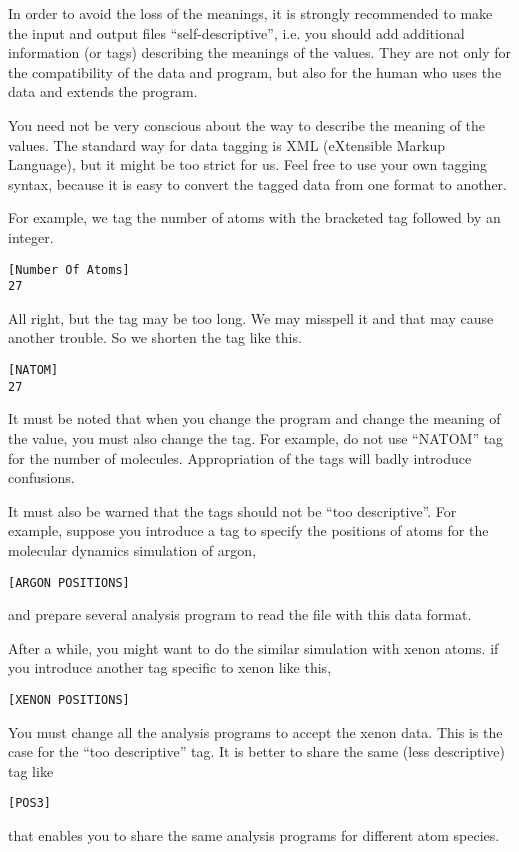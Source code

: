 \documentclass[a4,10pt]{article}
\begin{document}
In order to avoid the loss of the meanings, it is strongly recommended to make the input and output files ``self-descriptive'', i.e. you should add additional information (or tags) describing the meanings of the values.  They are not only for the compatibility of the data and program, but also for the human who uses the data and extends the program.

You need not be very conscious about the way to describe the meaning of the values.  The standard way for data tagging is XML (eXtensible Markup Language), but it might be too strict for us.  Feel free to use your own tagging syntax, because it is easy to convert the tagged data from one format to another.  

For example, we tag the number of atoms with the bracketed tag followed by an integer.
\begin{screen}\begin{verbatim}
[Number Of Atoms]
27
\end{verbatim}\end{screen}
All right, but the tag may be too long. We may misspell it and that may cause another trouble.  So we shorten the tag like this.
\begin{screen}\begin{verbatim}
[NATOM]
27
\end{verbatim}\end{screen}

It must be noted that when you change the program and change the meaning of the value, you must also change the tag.  For example, do not use ``NATOM'' tag for the number of molecules.  Appropriation of the tags will badly introduce confusions.

It must also be warned that the tags should not be ``too descriptive''.  For example, suppose you introduce a tag to specify the positions of atoms for the molecular dynamics simulation of argon,
\begin{screen}\begin{verbatim}
[ARGON POSITIONS]
\end{verbatim}\end{screen}
and prepare several analysis program to read the file with this data format.

After a while, you might want to do the similar simulation with xenon atoms.  if you introduce another tag specific to xenon like this,
\begin{screen}\begin{verbatim}
[XENON POSITIONS]
\end{verbatim}\end{screen}
You must change all the analysis programs to accept the xenon data.  This is the case for the ``too descriptive'' tag.  It is better to share the same (less descriptive) tag like
\begin{screen}\begin{verbatim}
[POS3]
\end{verbatim}\end{screen}
that enables you to share the same analysis programs for different atom species.
\end{document}
